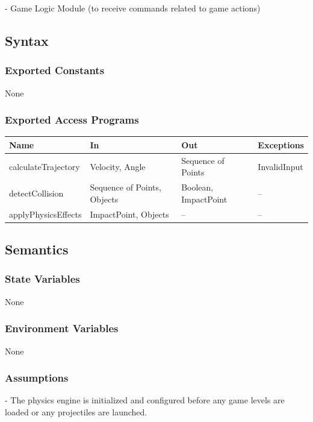 \documentclass[12pt]{article}
\begin{document}
- Game Logic Module (to receive commands related to game actions)

\subsection{Syntax}

\subsubsection{Exported Constants}

None

\subsubsection{Exported Access Programs}

\begin{tabular}{|l|l|l|l|}
\hline
\textbf{Name} & \textbf{In} & \textbf{Out} & \textbf{Exceptions} \\
\hline
calculateTrajectory & Velocity, Angle & Sequence of Points & InvalidInput \\
\hline
detectCollision & Sequence of Points, Objects & Boolean, ImpactPoint & -- \\
\hline
applyPhysicsEffects & ImpactPoint, Objects & -- & -- \\
\hline
\end{tabular}

\subsection{Semantics}

\subsubsection{State Variables}

None

\subsubsection{Environment Variables}

None

\subsubsection{Assumptions}

- The physics engine is initialized and configured before any game levels are loaded or any projectiles are launched.
\end{document}
